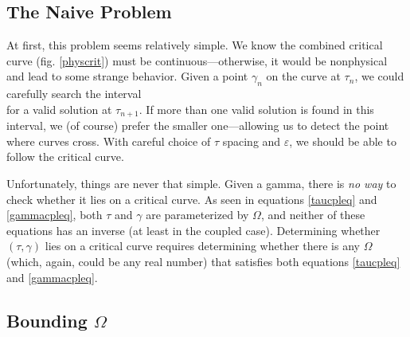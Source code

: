 \documentclass{article}
\begin{document}
    \subsection{The Naive Problem}
    At first, this problem seems relatively simple. We know the combined critical curve (fig. \ref{physcrit}) must be continuous---otherwise, it would be nonphysical and lead to some strange behavior. Given a point $\gamma_n$ on the curve at $\tau_n$, we could carefully search the interval
    \begin{equation*}
        [\gamma_n -\varepsilon, \gamma + \varepsilon]
    \end{equation*}
    for a valid solution at $\tau_{n+1}$. If more than one valid solution is found in this interval, we (of course) prefer the smaller one---allowing us to detect the point where curves cross. With careful choice of $\tau$ spacing and $\varepsilon$, we should be able to follow the critical curve.

    Unfortunately, things are never that simple. Given a gamma, there is \emph{no way} to check whether it lies on a critical curve. As seen in equations \ref{taucpleq} and \ref{gammacpleq}, both $\tau$ and $\gamma$ are parameterized by $\Omega$, and neither of these equations has an inverse (at least in the coupled case). Determining whether $(\tau,\gamma)$ lies on a critical curve requires determining whether there is any $\Omega$ (which, again, could be any real number) that satisfies both equations \ref{taucpleq} and \ref{gammacpleq}. 

    \subsection{Bounding $\Omega$}
\end{document}
